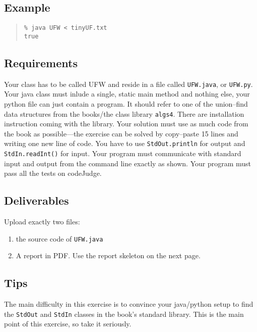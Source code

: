 \documentclass{tufte-handout}
\begin{document}
\subsection{Example}

\begin{quotation}
\begin{verbatim}
% java UFW < tinyUF.txt
true
\end{verbatim}
\end{quotation}

\subsection{Requirements}

Your class has to be called UFW and reside in a file called {\tt UFW.java}, or {\tt UFW.py}.
Your java class must inlude a single, static main method and nothing else, your python file can just contain a program.
It should refer to one of the union--find data structures from the \hbox{books}/the class library {\tt algs4}.
There are installation instruction coming with the library.
Your solution must use as much code from the book as possible---the exercise can be solved by copy--paste 15 lines and writing one new line of code.
You have to use {\tt StdOut.println} for output and {\tt StdIn.readInt()} for input.
Your program must communicate with standard input and output from the command line exactly as shown.
Your program must pass all the tests on codeJudge.

\subsection{Deliverables}

Upload exactly two files:

\begin{enumerate}
\item the source code of {\tt UFW.java}
\item A report in PDF. 
  Use the report skeleton on the next page.
\end{enumerate}

\subsection{Tips}
The main difficulty in this exercise is to convince your java/python setup to find the {\tt StdOut} and {\tt StdIn} classes in the book's standard library.
This is the main point of this exercise, so take it seriously. 
\end{document}
